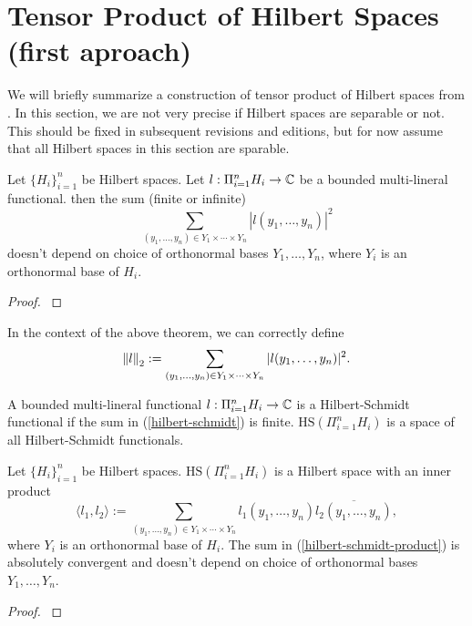 \documentclass[main.tex]{subfiles}
\begin{document}
\section{Tensor Product of Hilbert Spaces (first aproach)}
We will briefly summarize a construction of tensor product of Hilbert spaces from \cite{kadison-ringrose1983_I}. In this section, we are not very precise if Hilbert spaces are separable or not. This should be fixed in subsequent revisions and editions, but for now assume that all Hilbert spaces in this section are sparable. 
\begin{theorem}
Let $\{H_i\}_{i=1}^n$ be Hilbert spaces. Let $l:\Pi_{i=1}^n H_i\to\mathbb{C}$ be a bounded multi-lineral functional. 
then the sum (finite or infinite)
\begin{equation}
\label{hilbert-schmidt}
\sum_{(y_1,\dots, y_n)\in Y_1\times\cdots\times Y_n} |l(y_1,\dots, y_n)|^2 
\end{equation}
doesn't depend on choice of orthonormal bases $Y_1,\dots,Y_n$, where $Y_i$ is an orthonormal base of $H_i$.
\end{theorem}
\begin{proof}
\cite[see][2.6 Constructions with Hilbert Spaces]{kadison-ringrose1983_I}
\end{proof}
In the context of the above theorem, we can correctly define
\begin{equation}
\norm{l}_2:= \sum_{(y_1,\dots, y_n)\in Y_1\times\cdots\times Y_n} |l(y_1,\dots, y_n)|^2. 
\end{equation}
\begin{definition}
A bounded multi-lineral functional $l:\Pi_{i=1}^n H_i\to\mathbb{C}$ is a Hilbert-Schmidt functional if the sum in (\ref{hilbert-schmidt}) is finite. $\text{HS}(\Pi_{i=1}^n H_i)$ is a space of all Hilbert-Schmidt functionals.
\end{definition}
\begin{theorem}
Let $\{H_i\}_{i=1}^n$ be Hilbert spaces. $\text{HS}(\Pi_{i=1}^n H_i)$ is a Hilbert space with an inner product
\begin{equation}
\label{hilbert-schmidt-product}
\langle l_1, l_2 \rangle :=
\sum_{(y_1,\dots, y_n)\in Y_1\times\cdots\times Y_n}
l_1(y_1,\dots, y_n)\overline{l_2(y_1,\dots, y_n)}, 
\end{equation}
where $Y_i$ is an orthonormal base of $H_i$. The sum in (\ref{hilbert-schmidt-product}) is absolutely convergent and doesn't depend on choice of orthonormal bases $Y_1,\dots,Y_n$.
\end{theorem}
\begin{proof}
\cite[see][2.6 Constructions with Hilbert Spaces]{kadison-ringrose1983_I}
\end{proof}
\end{document}
